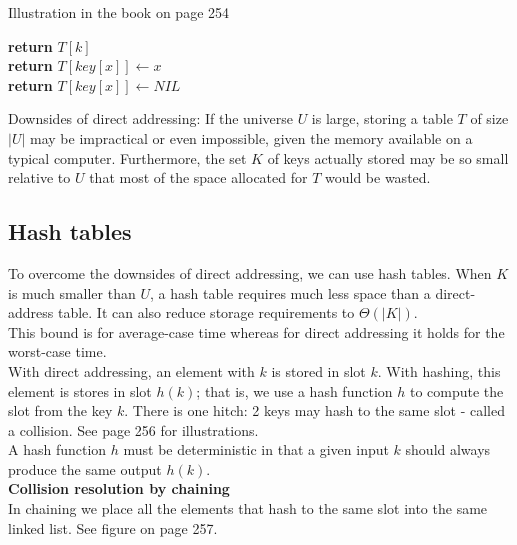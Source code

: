 \documentclass[12pt,a4paper]{article}
\begin{document}
Illustration in the book on page 254
\begin{algorithm}
\begin{algorithmic}[1]
   \State \textbf{return} $T[k]$\\
   
   \State \textbf{return} $T[key[x]] \leftarrow x$\\

   \State \textbf{return} $T[key[x]] \leftarrow NIL$
\end{algorithmic}
\end{algorithm}

Downsides of direct addressing: If the universe $U$ is large, storing a table $T$ of size $|U|$ may be impractical or even impossible, given the memory available on a typical computer. Furthermore, the set $K$ of keys actually stored may be so small relative to $U$ that most of the space allocated for $T$ would be wasted. 

\subsection{Hash tables}
To overcome the downsides of direct addressing, we can use hash tables. When $K$ is much smaller than $U$, a hash table requires much less space than a direct-address table. It can also reduce storage requirements to $\Theta (|K|)$. \\

This bound is for average-case time whereas for direct addressing it holds for the worst-case time. \\

With direct addressing, an element with $k$ is stored in slot $k$. With hashing, this element is stores in slot $h(k)$; that is, we use a hash function $h$ to compute the slot from the key $k$. There is one hitch: 2 keys may hash to the same slot - called a collision. See page 256 for illustrations. \\

A hash function $h$ must be deterministic in that a given input $k$ should always produce the same output $h(k)$. \\

\textbf{Collision resolution by chaining}\\
In chaining we place all the elements that hash to the same slot into the same linked list. See figure on page 257.
\end{document}
